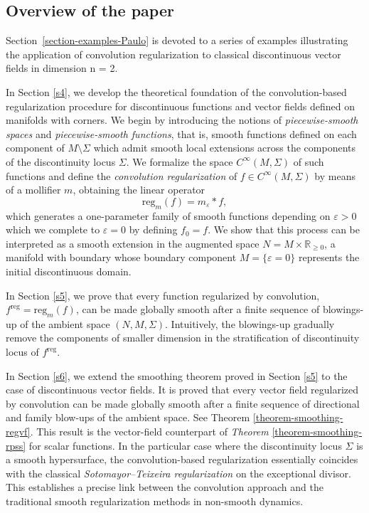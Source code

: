 \documentclass[11pt,psamsfonts]{article}
\theoremstyle{definition}
\theoremstyle{remark}
\newcommand{\eps}{\varepsilon }
\begin{document}
\subsection{Overview of the paper}\label{s2}
Section~\ref{section-examples-Paulo} is devoted to a series of examples illustrating the application of convolution regularization to classical discontinuous vector fields in dimension n = 2.

In Section \ref{s4},  we develop the theoretical foundation of the convolution-based regularization procedure 
for discontinuous functions and vector fields defined on manifolds with corners. We begin by introducing the 
notions of \emph{piecewise-smooth spaces} and \emph{piecewise-smooth functions}, that is, smooth functions 
defined on each component of \( M \setminus \Sigma \) which admit smooth local extensions across 
the components of the discontinuity locus \(\Sigma\). We formalize the space \( C^{\infty}(M,\Sigma) \) of 
such functions and define the \emph{convolution regularization} of \( f \in C^{\infty}(M,\Sigma) \) 
by means of a mollifier \( m \), obtaining the linear operator
\[
\mathrm{reg}_m(f) = m_\varepsilon * f,
\]
which generates a one-parameter family of smooth functions depending on \(\eps > 0\) 
which we complete to \(\varepsilon = 0\) by defining $f_0 = f$. We show that this process can be interpreted as 
a smooth extension in the augmented space \( N = M \times \mathbb{R}_{\ge 0} \), a manifold with boundary whose boundary component \( M = \{\varepsilon = 0\} \) represents the initial discontinuous domain.

In Section \ref{s5}, we prove that every function regularized by convolution, \( f^{\mathrm{reg}} = \mathrm{reg}_m(f) \), 
can be made globally smooth after a finite sequence of blowings-up of the ambient space \((N, M, \Sigma)\). Intuitively, the blowings-up gradually remove the components of smaller dimension in the stratification of discontinuity locus of \( f^{\mathrm{reg}} \).

In Section \ref{s6}, we extend the smoothing theorem proved in Section \ref{s5} to 
the case of discontinuous vector fields.  It is proved that every vector field regularized by convolution can be
made globally smooth after a finite sequence of directional and family blow-ups of the ambient space. See Theorem \ref{theorem-smoothing-regvf}. This result is the vector-field counterpart of \textit{Theorem} 
\ref{theorem-smoothing-rpss} for scalar functions. In the particular case where the discontinuity locus \(\Sigma\) is a smooth hypersurface, the convolution-based regularization essentially coincides with the classical \textit{Sotomayor--Teixeira regularization} on the exceptional divisor.  
This establishes a precise link between the convolution approach and the traditional smooth regularization methods in non-smooth dynamics.
    
\end{document}
